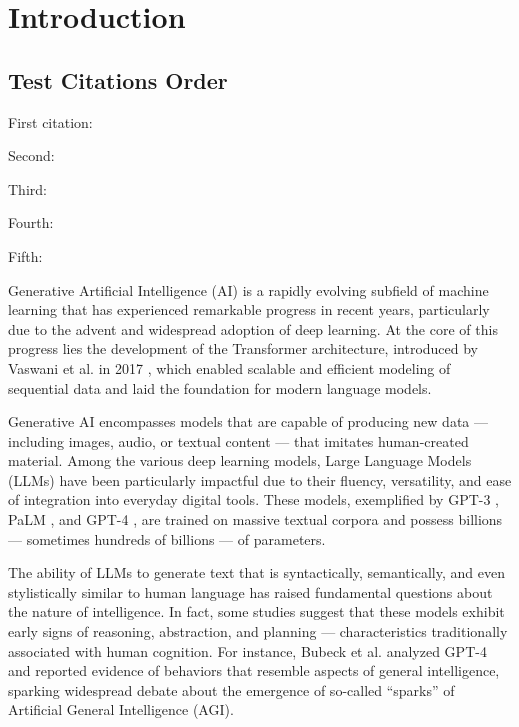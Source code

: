 \clearpage
\chapter{Introduction}

\section{Test Citations Order}

First citation: \cite{vaswani2017attention} %

Second: \cite{brown2020language} %

Third: \cite{bubeck2023sparks} %

Fourth: \cite{chowdhery2022palm} %

Fifth: \cite{openai2023gpt4} %



Generative Artificial Intelligence (AI) is a rapidly evolving subfield of machine learning that has experienced remarkable progress in recent years, particularly due to the advent and widespread adoption of deep learning. At the core of this progress lies the development of the Transformer architecture, introduced by Vaswani et al. in 2017 \cite{vaswani2017attention}, which enabled scalable and efficient modeling of sequential data and laid the foundation for modern language models.

Generative AI encompasses models that are capable of producing new data — including images, audio, or textual content — that imitates human-created material. Among the various deep learning models, Large Language Models (LLMs) have been particularly impactful due to their fluency, versatility, and ease of integration into everyday digital tools. These models, exemplified by GPT-3 \cite{brown2020language}, PaLM \cite{chowdhery2022palm}, and GPT-4 \cite{openai2023gpt4}, are trained on massive textual corpora and possess billions — sometimes hundreds of billions — of parameters.

The ability of LLMs to generate text that is syntactically, semantically, and even stylistically similar to human language has raised fundamental questions about the nature of intelligence. In fact, some studies suggest that these models exhibit early signs of reasoning, abstraction, and planning — characteristics traditionally associated with human cognition. For instance, Bubeck et al. \cite{bubeck2023sparks} analyzed GPT-4 and reported evidence of behaviors that resemble aspects of general intelligence, sparking widespread debate about the emergence of so-called “sparks” of Artificial General Intelligence (AGI).


